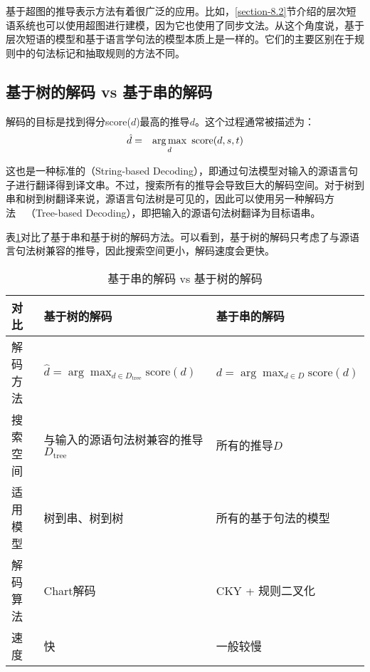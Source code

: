 \parinterval 基于超图的推导表示方法有着很广泛的应用。比如，\ref{section-8.2}节介绍的层次短语系统也可以使用超图进行建模，因为它也使用了同步文法。从这个角度说，基于层次短语的模型和基于语言学句法的模型本质上是一样的。它们的主要区别在于规则中的句法标记和抽取规则的方法不同。


\subsection{基于树的解码 vs 基于串的解码}

\parinterval 解码的目标是找到得分score($d$)最高的推导$d$。这个过程通常被描述为：
\begin{eqnarray}
\hat{d} & = & \operatorname*{arg\,max}_d\ \textrm{score} (d,{s},{t})
\label{eq:8-13}
\end{eqnarray}

\parinterval 这也是一种标准的{\small{}}（String-based Decoding），即通过句法模型对输入的源语言句子进行翻译得到译文串。不过，搜索所有的推导会导致巨大的解码空间。对于树到串和树到树翻译来说，源语言句法树是可见的，因此可以使用另一种解码方法\ \dash \ {\small{}}（Tree-based Decoding），即把输入的源语句法树翻译为目标语串。

\parinterval 表\ref{tab:8-4}对比了基于串和基于树的解码方法。可以看到，基于树的解码只考虑了与源语言句法树兼容的推导，因此搜索空间更小，解码速度会更快。

\begin{table}[htp]{
\begin{center}
\caption{基于串的解码 vs 基于树的解码}
\label{tab:8-4}
{
\begin{tabular}{l | p{16.5em} p{12em}}
对比 & 基于树的解码 & 基于串的解码 \\
\hline
\rule{0pt}{15pt}解码方法 & $\hat{d} = \arg\max_{d \in D_{\textrm{tree}}} \textrm{score} (d)$ & $\hat{d} = \arg\max_{d \in D} \textrm{score} (d)$ \\
\rule{0pt}{15pt}搜索空间 & 与输入的源语句法树兼容的推导$D_{\textrm{tree}}$ & 所有的推导$D$ \\
\rule{0pt}{15pt}适用模型 & 树到串、树到树 & 所有的基于句法的模型 \\
\rule{0pt}{15pt}解码算法 & Chart解码 & CKY + 规则二叉化 \\
\rule{0pt}{15pt}速度 & 快 & 一般较慢
\end{tabular}
}
\end{center}
}\end{table}

